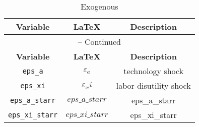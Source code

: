 \begin{center}
\begin{longtable}{ccc}
\caption{Exogenous}\\%
\hline%
\multicolumn{1}{c}{\textbf{Variable}} &
\multicolumn{1}{c}{\textbf{\LaTeX}} &
\multicolumn{1}{c}{\textbf{Description}}\\%
\hline\hline%
\endfirsthead
\multicolumn{3}{c}{{\tablename} \thetable{} -- Continued}\\%
\hline%
\multicolumn{1}{c}{\textbf{Variable}} &
\multicolumn{1}{c}{\textbf{\LaTeX}} &
\multicolumn{1}{c}{\textbf{Description}}\\%
\hline\hline%
\endhead
\texttt{eps\_a} & ${\varepsilon_a}$ & technology shock\\
\texttt{eps\_xi} & ${\varepsilon_xi}$ & labor disutility shock\\
\texttt{eps\_a\_starr} & $eps\_a\_starr$ & eps\_a\_starr\\
\texttt{eps\_xi\_starr} & $eps\_xi\_starr$ & eps\_xi\_starr\\
\hline%
\end{longtable}
\end{center}
